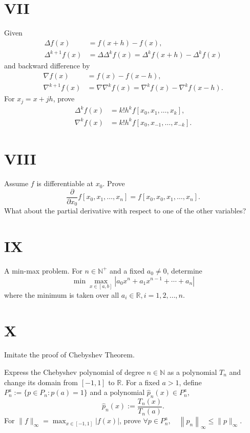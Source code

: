 \documentclass[a4paper]{article}
\begin{document}
\section*{VII}
Given
\begin{subequations}
\begin{align*}
\Delta f(x) &= f(x+h) - f(x), \\
\Delta^{k+1} f(x) &= \Delta \Delta^k f(x) = \Delta^k f(x+h) - \Delta^k f(x)
\end{align*}
\end{subequations}
and backward difference by
\begin{subequations}
\begin{align*}
\nabla f(x) &= f(x) - f(x-h), \\
\nabla^{k+1} f(x) &= \nabla \nabla^k f(x) = \nabla^k f(x) - \nabla^k f(x-h).
\end{align*}
\end{subequations}
For \( x_j = x + jh \), prove
\begin{subequations}
\begin{align*}
\Delta^k f(x) &= k! h^k f\left[x_0, x_1, \ldots, x_k\right], \\
\nabla^k f(x) &= k! h^k f\left[x_0, x_{-1}, \ldots, x_{-k}\right].
\end{align*}
\end{subequations}

\section*{VIII}
Assume \( f \) is differentiable at \( x_0 \). Prove
\[
\frac{\partial}{\partial x_0} f[x_0, x_1, \ldots, x_n] = f[x_0, x_0, x_1, \ldots, x_n].
\]
What about the partial derivative with respect to one of the other variables?

\section*{IX}
A min-max problem. For \( n \in \mathbb{N}^+ \) and a fixed \( a_0 \neq 0 \), determine
\[
\min \max_{x \in [a, b]} \left| a_0 x^n + a_1 x^{n-1} + \cdots + a_n \right|
\]
where the minimum is taken over all \( a_i \in \mathbb{R}, i = 1, 2, \ldots, n \).

\section*{X}
Imitate the proof of Chebyshev Theorem.

Express the Chebyshev polynomial of degree \( n \in \mathbb{N} \) as a polynomial \( T_n \) and change its domain from \([-1,1]\) to \(\mathbb{R}\). For a fixed \( a > 1 \), define \( P_n^a := \{ p \in P_n : p(a) = 1 \} \) and a polynomial \( \hat{p}_n(x) \in P_n^a \),
\[
\hat{p}_n(x) := \frac{T_n(x)}{T_n(a)}.
\]
For \( \| f \|_{\infty} = \max_{x \in [-1,1]} |f(x)| \), prove \( \forall p \in P_n^a, \quad \left\| \hat{p}_n \right\|_{\infty} \leq \| p \|_{\infty} \).
\end{document}
